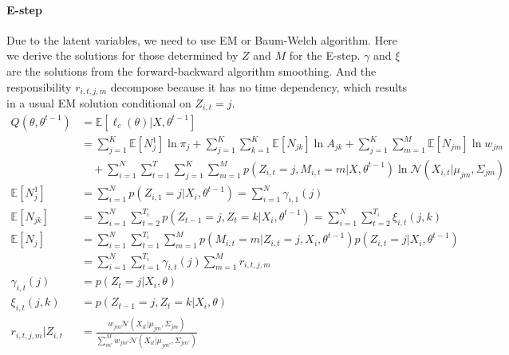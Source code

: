 \documentclass[11pt, letterpaper]{article}
\begin{document}
\paragraph{E-step}
Due to the latent variables, we need to use EM or Baum-Welch algorithm. Here we derive the solutions for those determined by $Z$ and $M$ for the E-step. $\gamma$ and $\xi$ are the solutions from the forward-backward algorithm smoothing. And the responsibility $r_{i,t,j,m}$ decompose because it has no time dependency, which results in a usual EM solution conditional on $Z_{i,t}=j$.
\begin{align*}
    Q(\theta, \theta^{t-1}) &= \mathbb{E}[\ell_c(\theta) | X, \theta^{t-1}] \\
        &= \sum_{j=1}^K \mathbb{E}[N_j^1] \ln \pi_j
        + \sum_{j=1}^K \sum_{k=1}^K \mathbb{E}[N_{jk}] \ln A_{jk} 
        + \sum_{j=1}^K\sum_{m=1}^M \mathbb{E}[N_{jm}] \ln w_{jm} \\
        & \quad
        + \sum_{i=1}^N \sum_{t=1}^T\sum_{j=1}^K\sum_{m=1}^M p(Z_{i,t}=j, M_{i,t}=m|X,\theta^{t-1})
            \ln \mathcal{N}(X_{i,t}|\mu_{jm}, \Sigma_{jm}) \\
    \mathbb{E}[N_j^1] &= \sum_{i=1}^N p(Z_{i,1}=j | X_i, \theta^{t-1}) = \sum_{i=1}^N \gamma_{i,1}(j) \\
    \mathbb{E}[N_{jk}] &= \sum_{i=1}^N \sum_{t=2}^{T_i} p(Z_{t-1}=j, Z_t=k|X_i, \theta^{t-1})
        = \sum_{i=1}^N \sum_{t=2}^{T_i} \xi_{i,t}(j, k) \\
    \mathbb{E}[N_{j}] &= \sum_{i=1}^N \sum_{t=1}^{T_i} \sum_{m=1}^M
        p(M_{i,t}=m|Z_{i,t}=j, X_i, \theta^{t-1}) p(Z_{i,t}=j|X_i, \theta^{t-1}) \\
        &= \sum_{i=1}^N \sum_{t=1}^{T_i} \gamma_{i,t}(j) \sum_{m=1}^M r_{i,t,j,m} \\
    \gamma_{i,t}(j) &= p(Z_t=j|X_i, \theta) \\
    \xi_{i,t}(j, k) &= p(Z_{t-1}=j, Z_t=k|X_i, \theta) \\
    r_{i,t,j,m}|Z_{i,t} &=
        \frac{w_{jm} \mathcal{N}(X_{it}|\mu_{jm}, \Sigma_{jm})}
             {\sum_{m'}^M w_{jm'} \mathcal{N}(X_{it}|\mu_{jm'}, \Sigma_{jm'})}
\end{align*}
\end{document}
